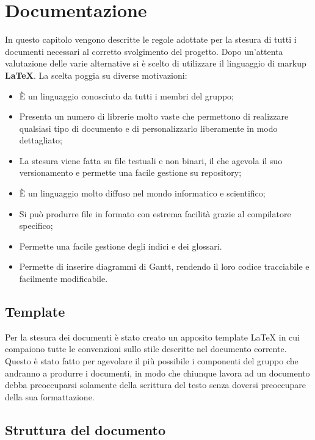 \section{Documentazione}

In questo capitolo vengono descritte le regole adottate per la stesura di tutti i documenti necessari al corretto svolgimento del progetto. Dopo un'attenta valutazione delle varie alternative si è scelto di utilizzare il linguaggio di markup \textbf{\LaTeX{}}. La scelta poggia su diverse motivazioni:

\begin{itemize}

	\item È un linguaggio conosciuto da tutti i membri del gruppo;
	\item Presenta un numero di librerie molto vaste che permettono di realizzare qualsiasi tipo di documento e di personalizzarlo liberamente in modo dettagliato;
	\item La stesura viene fatta su file testuali e non binari, il che agevola il suo versionamento e permette una facile gestione su repository;
	\item È un linguaggio molto diffuso nel mondo informatico e scientifico;
	\item Si può produrre file in formato  con estrema facilità grazie al compilatore specifico;
	\item Permette una facile gestione degli indici e dei glossari.
	\item Permette di inserire diagrammi di Gantt, rendendo il loro codice tracciabile e facilmente modificabile.

\end{itemize}

\subsection{Template}

Per la stesura dei documenti è stato creato un apposito template \LaTeX{} in cui compaiono tutte le convenzioni sullo stile descritte nel documento corrente. Questo è stato fatto per agevolare il più possibile i componenti del gruppo che andranno a produrre i documenti, in modo che chiunque lavora ad un documento debba preoccuparsi solamente della scrittura del testo senza doversi preoccupare della sua formattazione. 

\subsection{Struttura del documento}

